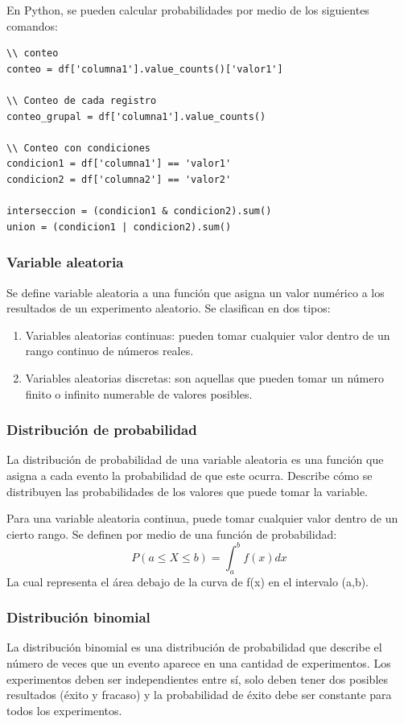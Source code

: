 \documentclass[a4paper, 12pt]{book}
\begin{document}
En Python, se pueden calcular probabilidades por medio de los siguientes comandos:
\begin{verbatim}
\\ conteo
conteo = df['columna1'].value_counts()['valor1']
	
\\ Conteo de cada registro
conteo_grupal = df['columna1'].value_counts()
	
\\ Conteo con condiciones
condicion1 = df['columna1'] == 'valor1'
condicion2 = df['columna2'] == 'valor2'
	
interseccion = (condicion1 & condicion2).sum()
union = (condicion1 | condicion2).sum()
\end{verbatim}

\subsubsection{Variable aleatoria}
Se define variable aleatoria a una función que asigna un valor numérico a los resultados de un experimento aleatorio. Se clasifican en dos tipos:
\begin{enumerate}
	\item Variables aleatorias continuas: pueden tomar cualquier valor dentro de un rango continuo de números reales.
	\item Variables aleatorias discretas: son aquellas que pueden tomar un número finito o infinito numerable de valores posibles.
\end{enumerate}

\subsubsection{Distribución de probabilidad}
La distribución de probabilidad de una variable aleatoria es una función que asigna a cada evento la probabilidad de que este ocurra. Describe cómo se distribuyen las probabilidades de los valores que puede tomar la variable.

Para una variable aleatoria continua, puede tomar cualquier valor dentro de un cierto rango. Se definen por medio de una función de probabilidad:
\begin{equation}
	P(a \leqslant X \leqslant b) = \int_{a}^{b} f(x)dx
\end{equation}
La cual representa el área debajo de la curva de f(x) en el intervalo (a,b).

\subsubsection{Distribución binomial}
La distribución binomial es una distribución de probabilidad que describe el número de veces que un evento aparece en una cantidad de experimentos. Los experimentos deben ser independientes entre sí, solo deben tener dos posibles resultados (éxito y fracaso) y la probabilidad de éxito debe ser constante para todos los experimentos.
\end{document}
